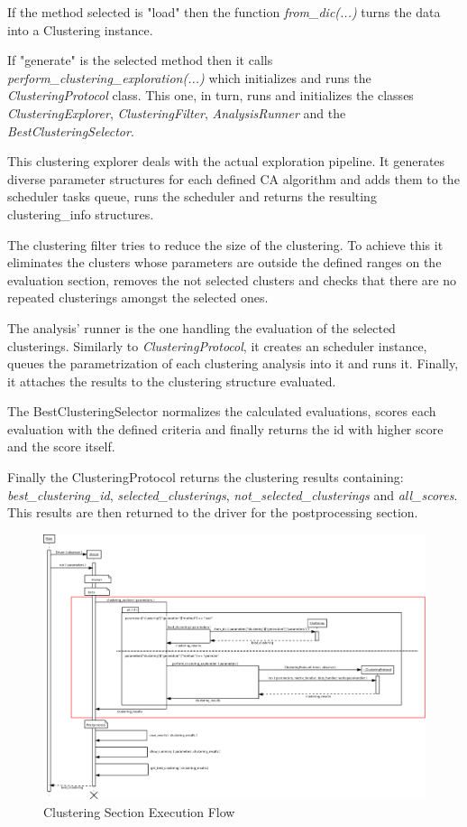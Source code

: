 If the method selected is "load" then the function \textit{from\_dic(...)} turns the data into a Clustering instance. 

If "generate" is the selected method then it calls \textit{perform\_clustering\_exploration(...)} which initializes and runs the \textit{ClusteringProtocol} class. This one, in turn, runs and initializes the classes  \textit{ClusteringExplorer}, \textit{ClusteringFilter}, \textit{AnalysisRunner} and the \textit{BestClusteringSelector}.

This clustering explorer deals with the actual exploration pipeline. It generates diverse parameter structures for each defined CA algorithm and adds them to the scheduler tasks queue, runs the scheduler and returns the resulting clustering\_info structures. 

The clustering filter tries to reduce the size of the clustering. To achieve this it eliminates the clusters whose parameters are outside the defined ranges on the evaluation section, removes the not selected clusters and checks that there are no repeated clusterings amongst the selected ones.

The analysis' runner is the one handling the evaluation of the selected clusterings. Similarly to \textit{ClusteringProtocol}, it creates an scheduler instance, queues the parametrization of each clustering analysis into it and runs it. Finally, it attaches the results to the clustering structure evaluated.

The BestClusteringSelector normalizes the calculated evaluations, scores each evaluation with the defined criteria and finally returns the id with higher score and the score itself.

Finally the ClusteringProtocol returns the clustering results containing:  \textit{best\_clustering\_id}, \textit{selected\_clusterings}, \textit{not\_selected\_clusterings} and \textit{all\_scores}. This results are then returned to the driver for the postprocessing section.

\begin{landscape}
\begin{figure}
\includegraphics[width=24cm]{img/clustering_sequence_driver.png}
\caption{Clustering Section Execution Flow}
\label{fig:clustering_section}
\end{figure}
\end{landscape}



